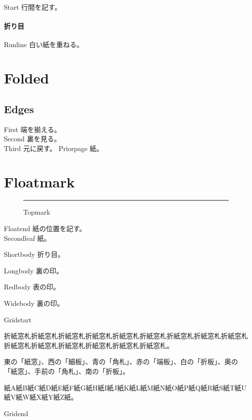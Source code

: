 \documentclass[11pt,a4paper]{ltjsarticle}
\begin{document}
\noindent Start 行間を記す。\par
\vspace*{195mm}
\paragraph{折り目} Runline 白い紙を重ねる。
\section{Folded}
\subsection{Edges}
First 端を揃える。\\Second 裏を見る。\\Third 元に戻す。
\clearpage
\noindent Priorpage 紙。\par\vspace*{216mm}\par\section{Floatmark}
\begin{figure}[htbp]\centering\rule{32mm}{10mm}\caption{Topmark}\end{figure}
\noindent Floatend 紙の位置を記す。\\Secondleaf 紙。
\begin{description}[style=nextline]
\item[短] Shortbody 折り目。
\item[幅広い紙の端] Longbody 裏の印。
\end{description}
\begin{description}[style=nextline,leftmargin=4em,labelwidth=2em,labelsep=.75em]
\item[赤] Redbody 表の印。
\item[長い折り目] Widebody 裏の印。
\end{description}
\noindent Gridstart\par
\noindent 折紙窓札折紙窓札折紙窓札折紙窓札折紙窓札折紙窓札折紙窓札折紙窓札折紙窓札折紙窓札折紙窓札折紙窓札折紙窓札折紙窓札折紙窓札。\par
\noindent 東の「紙窓」、西の「細板」、青の「角札」、赤の「端板」、白の「折板」、奥の「紙窓」、手前の「角札」、南の「折板」。\par
\noindent 紙A紙B紙C紙D紙E紙F紙G紙H紙I紙J紙K紙L紙M紙N紙O紙P紙Q紙R紙S紙T紙U紙V紙W紙X紙Y紙Z紙。\par
\noindent Gridend
\end{document}
